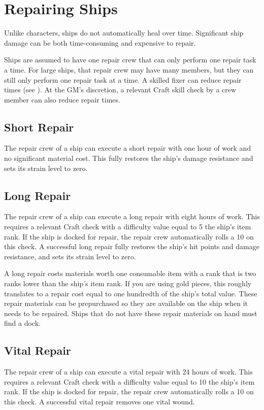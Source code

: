 \section{Repairing Ships}
  Unlike characters, ships do not automatically heal over time.
  Significant ship damage can be both time-consuming and expensive to repair.

  Ships are assumed to have one repair crew that can only perform one repair task a time.
  For large ships, that repair crew may have many members, but they can still only perform one repair task at a time.
  A skilled fixer can reduce repair times (see ).
  At the GM's discretion, a relevant Craft skill check by a crew member can also reduce repair times.

  \subsection{Short Repair}
    The repair crew of a ship can execute a short repair with one hour of work and no significant material cost.
    This fully restores the ship's damage resistance and sets its strain level to zero.

  \subsection{Long Repair}
    The repair crew of a ship can execute a long repair with eight hours of work.
    This requires a relevant Craft check with a difficulty value equal to 5 \add the ship's item rank.
    If the ship is docked for repair, the repair crew automatically rolls a 10 on this check.
    A successful long repair fully restores the ship's hit points and damage resistance, and sets its strain level to zero.

    A long repair costs materials worth one consumable item with a rank that is two ranks lower than the ship's item rank.
    If you are using gold pieces, this roughly translates to a repair cost equal to one hundredth of the ship's total value.
    These repair materials can be prepurchased so they are available on the ship when it needs to be repaired.
    Ships that do not have these repair materials on hand must find a dock.

  \subsection{Vital Repair}
    The repair crew of a ship can execute a vital repair with 24 hours of work.
    This requires a relevant Craft check with a difficulty value equal to 10 \add the ship's item rank.
    If the ship is docked for repair, the repair crew automatically rolls a 10 on this check.
    A successful vital repair removes one vital wound.

